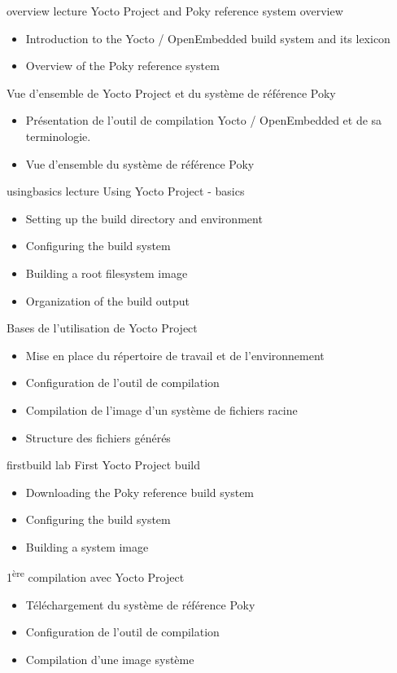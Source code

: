 {overview}
{lecture}
{Yocto Project and Poky reference system overview}
{
  \begin{itemize}
  \item Introduction to the Yocto / OpenEmbedded build system and its lexicon
  \item Overview of the Poky reference system
  \end{itemize}
}
{Vue d'ensemble de Yocto Project et du système de référence Poky}
{
  \begin{itemize}
  \item Présentation de l'outil de compilation Yocto / OpenEmbedded et de sa terminologie.
  \item Vue d'ensemble du système de référence Poky
  \end{itemize}
}

{usingbasics}
{lecture}
{Using Yocto Project - basics}
{
  \begin{itemize}
  \item Setting up the build directory and environment
  \item Configuring the build system
  \item Building a root filesystem image
  \item Organization of the build output
  \end{itemize}
}
{Bases de l'utilisation de Yocto Project}
{
  \begin{itemize}
  \item Mise en place du répertoire de travail et de l'environnement
  \item Configuration de l'outil de compilation
  \item Compilation de l'image d'un système de fichiers racine
  \item Structure des fichiers générés
  \end{itemize}
}

{firstbuild}
{lab}
{First Yocto Project build}
{
  \begin{itemize}
  \item Downloading the Poky reference build system
  \item Configuring the build system
  \item Building a system image
 \end{itemize}
}
{1\textsuperscript{ère} compilation avec Yocto Project}
{
  \begin{itemize}
  \item Téléchargement du système de référence Poky
  \item Configuration de l'outil de compilation
  \item Compilation d'une image système
 \end{itemize}
}

